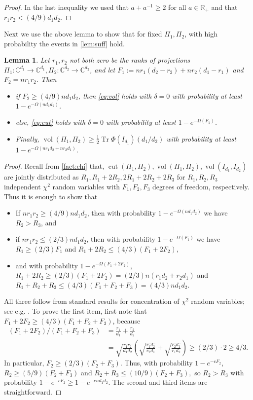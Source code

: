 \documentclass[aos]{imsart}
\newtheorem{lemma}[theorem]{Lemma}
\theoremstyle{definition}
\numberwithin{equation}{section}
\DeclareMathOperator{\vol}{vol}
\DeclareMathOperator{\cut}{cut}
\DeclareMathOperator{\tr}{Tr}
\newcommand{\R}{{\mathbb{R}}}
\newcommand{\C}{{\mathbb{C}}}
\begin{document}
\begin{appendix}
\begin{proof}
In the last inequality we used that $a + a^{-1} \geq 2$ for all $a \in \R_+$ and that $r_1 r_2 < (4/9) d_1 d_2$. \end{proof}


Next we use the above lemma to show that for fixed $\Pi_1, \Pi_2$, with high probability the events in \cref{lem:suff} hold.
\begin{lemma}\label{lem:probabilities}
Let $r_1, r_2$ not both zero be the ranks of projections $\Pi_1: \C^{d_1} \to \C^{d_1}, \Pi_2: \C^{d_2} \to \C^{d_2}$, and let $F_1:= n r_1(d_2 - r_2) + n r_2(d_1-r_1)$ and $F_2 = n r_1 r_2$. Then
\begin{itemize}
\item if $F_2 \geq (4/9) n d_1 d_2$, then \cref{eq:vol} holds with $\delta = 0$ with probability at least $1 - e^{-\Omega( n d_1 d_2)}$.
\item else, \cref{eq:cut} holds with $\delta = 0$ with probability at least $1 - e^{-\Omega( F_1)}$.
\item Finally, $\vol(\Pi_1, \Pi_2) \geq \frac{1}{2}\tr \Phi(I_{d_1}) (d_1/d_2)$ with probability at least $1 - e^{- \Omega(n r_1 d_2 + n r_2 d_1)}$.
\end{itemize}
\end{lemma}


\begin{proof}
Recall from \cref{fact:chi} that, $\cut(\Pi_1, \Pi_2), \vol(\Pi_1, \Pi_2), \vol(I_{d_1}, I_{d_2})$ are jointly distributed as $R_1, R_1 + 2R_2, 2R_1 + 2R_2 + 2R_3$ for $R_1, R_2, R_3$ independent $\chi^2$ random variables with $F_1, F_2, F_3$ degrees of freedom, respectively. Thus it is enough to show that
\begin{itemize}
\item If $nr_1 r_2 \geq (4/9) n d_1 d_2$, then with probability $1 - e^{- \Omega( n d_1 d_2)}$ we have $R_2 > R_3$, and
\item if $nr_1 r_2 \leq (2/3) n d_1 d_2$, then with probability $1 - e^{- \Omega(F_1)}$ we have $R_1 \geq (2/3) F_1$ and $R_1 + 2R_2 \leq (4/3) (F_1 + 2 F_2),$
\item and with probability $1 - e^{- \Omega(F_1 + 2 F_2)}$, $R_1 + 2R_2 \geq (2/3) (F_1 + 2 F_2) = (2/3) n (r_1 d_2 + r_2 d_1)$ and $R_1 + R_2 + R_3 \leq (4/3)(F_1 + F_2 + F_3) = (4/3)n d_1 d_2$.
\end{itemize}
All three follow from standard results for concentration of $\chi^2$ random variables; see e.g. \cite{W19}. To prove the first item, first note that $F_1 + 2 F_2 \geq (4/3)(F_1 + F_2 + F_3)$, because
\begin{align*}
(F_1 + 2 F_2)/( F_1 + F_2 + F_3) &= \frac{r_1}{d_1} + \frac{r_2}{d_2}\\
 &= \sqrt{ \frac{r_1 r_2}{d_1 d_2}}\left( \sqrt{ \frac{r_1 d_2}{r_2 d_1}} + \sqrt{ \frac{r_2 d_1}{r_1 d_2}}\right) \geq (2/3) \cdot 2 \geq 4/3.
\end{align*}
In particular, $F_2 \geq (2/3)(F_2 + F_3)$. Thus, with probability $1 - e^{- c F_2}$, $R_2 \geq (5/9) (F_2 + F_3)$ and $R_2 + R_3 \leq (10/9) (F _2 + F_3),$ so $R_2 > R_3$ with probability $1 - e^{- c F_2} \geq 1 - e^{- c n d_1 d_2}$. The second and third items are straightforward.
\end{proof}


\end{appendix}
\end{document}

